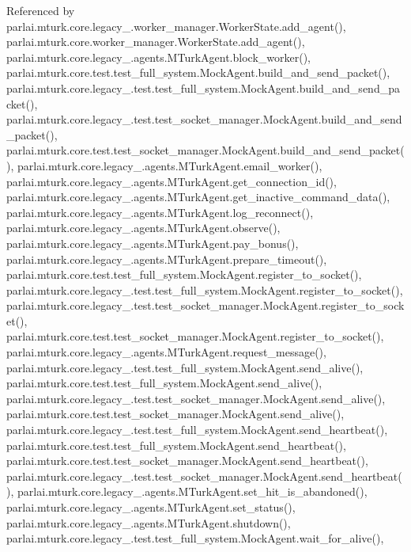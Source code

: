 Referenced by parlai.\+mturk.\+core.\+legacy\+\_.\+worker\+\_\+manager.\+Worker\+State.\+add\+\_\+agent(), parlai.\+mturk.\+core.\+worker\+\_\+manager.\+Worker\+State.\+add\+\_\+agent(), parlai.\+mturk.\+core.\+legacy\+\_.\+agents.\+M\+Turk\+Agent.\+block\+\_\+worker(), parlai.\+mturk.\+core.\+test.\+test\+\_\+full\+\_\+system.\+Mock\+Agent.\+build\+\_\+and\+\_\+send\+\_\+packet(), parlai.\+mturk.\+core.\+legacy\+\_.\+test.\+test\+\_\+full\+\_\+system.\+Mock\+Agent.\+build\+\_\+and\+\_\+send\+\_\+packet(), parlai.\+mturk.\+core.\+legacy\+\_.\+test.\+test\+\_\+socket\+\_\+manager.\+Mock\+Agent.\+build\+\_\+and\+\_\+send\+\_\+packet(), parlai.\+mturk.\+core.\+test.\+test\+\_\+socket\+\_\+manager.\+Mock\+Agent.\+build\+\_\+and\+\_\+send\+\_\+packet(), parlai.\+mturk.\+core.\+legacy\+\_.\+agents.\+M\+Turk\+Agent.\+email\+\_\+worker(), parlai.\+mturk.\+core.\+legacy\+\_.\+agents.\+M\+Turk\+Agent.\+get\+\_\+connection\+\_\+id(), parlai.\+mturk.\+core.\+legacy\+\_.\+agents.\+M\+Turk\+Agent.\+get\+\_\+inactive\+\_\+command\+\_\+data(), parlai.\+mturk.\+core.\+legacy\+\_.\+agents.\+M\+Turk\+Agent.\+log\+\_\+reconnect(), parlai.\+mturk.\+core.\+legacy\+\_.\+agents.\+M\+Turk\+Agent.\+observe(), parlai.\+mturk.\+core.\+legacy\+\_.\+agents.\+M\+Turk\+Agent.\+pay\+\_\+bonus(), parlai.\+mturk.\+core.\+legacy\+\_.\+agents.\+M\+Turk\+Agent.\+prepare\+\_\+timeout(), parlai.\+mturk.\+core.\+test.\+test\+\_\+full\+\_\+system.\+Mock\+Agent.\+register\+\_\+to\+\_\+socket(), parlai.\+mturk.\+core.\+legacy\+\_.\+test.\+test\+\_\+full\+\_\+system.\+Mock\+Agent.\+register\+\_\+to\+\_\+socket(), parlai.\+mturk.\+core.\+legacy\+\_.\+test.\+test\+\_\+socket\+\_\+manager.\+Mock\+Agent.\+register\+\_\+to\+\_\+socket(), parlai.\+mturk.\+core.\+test.\+test\+\_\+socket\+\_\+manager.\+Mock\+Agent.\+register\+\_\+to\+\_\+socket(), parlai.\+mturk.\+core.\+legacy\+\_.\+agents.\+M\+Turk\+Agent.\+request\+\_\+message(), parlai.\+mturk.\+core.\+legacy\+\_.\+test.\+test\+\_\+full\+\_\+system.\+Mock\+Agent.\+send\+\_\+alive(), parlai.\+mturk.\+core.\+test.\+test\+\_\+full\+\_\+system.\+Mock\+Agent.\+send\+\_\+alive(), parlai.\+mturk.\+core.\+legacy\+\_.\+test.\+test\+\_\+socket\+\_\+manager.\+Mock\+Agent.\+send\+\_\+alive(), parlai.\+mturk.\+core.\+test.\+test\+\_\+socket\+\_\+manager.\+Mock\+Agent.\+send\+\_\+alive(), parlai.\+mturk.\+core.\+legacy\+\_.\+test.\+test\+\_\+full\+\_\+system.\+Mock\+Agent.\+send\+\_\+heartbeat(), parlai.\+mturk.\+core.\+test.\+test\+\_\+full\+\_\+system.\+Mock\+Agent.\+send\+\_\+heartbeat(), parlai.\+mturk.\+core.\+test.\+test\+\_\+socket\+\_\+manager.\+Mock\+Agent.\+send\+\_\+heartbeat(), parlai.\+mturk.\+core.\+legacy\+\_.\+test.\+test\+\_\+socket\+\_\+manager.\+Mock\+Agent.\+send\+\_\+heartbeat(), parlai.\+mturk.\+core.\+legacy\+\_.\+agents.\+M\+Turk\+Agent.\+set\+\_\+hit\+\_\+is\+\_\+abandoned(), parlai.\+mturk.\+core.\+legacy\+\_.\+agents.\+M\+Turk\+Agent.\+set\+\_\+status(), parlai.\+mturk.\+core.\+legacy\+\_.\+agents.\+M\+Turk\+Agent.\+shutdown(), parlai.\+mturk.\+core.\+legacy\+\_.\+test.\+test\+\_\+full\+\_\+system.\+Mock\+Agent.\+wait\+\_\+for\+\_\+alive(), 
